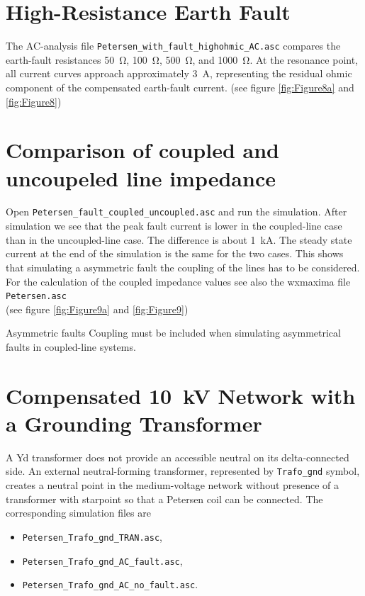 \section{High-Resistance Earth Fault}
\label{sec:110kv-high-resistance-earth-fault}

The AC-analysis file \texttt{Petersen\_with\_fault\_highohmic\_AC.asc}
compares the earth-fault resistances \SI{50}{\ohm}, \SI{100}{\ohm},
\SI{500}{\ohm}, and \SI{1000}{\ohm}. At the resonance point, all current
curves approach approximately \SI{3}{\ampere}, representing the residual
ohmic component of the compensated earth-fault current.
(see figure \ref{fig:Figure8a} and \ref{fig:Figure8})

\section{Comparison of coupled and uncoupeled line impedance}
\label{sec:coupled-uncoupled}
Open \texttt{Petersen\_fault\_coupled\_uncoupled.asc} and run the simulation.
After simulation we see that the peak fault current is lower in the coupled-line case than in the uncoupled-line case. The difference is about \SI{1}{\kilo\ampere}. The steady state current at the end of the simulation is the same for the two cases. 
This shows that simulating a asymmetric fault the coupling of the lines has to be
considered. For the calculation of the coupled impedance values see also the wxmaxima file \texttt{Petersen.asc}\\
(see figure \ref{fig:Figure9a} and \ref{fig:Figure9})

\begin{important}{Asymmetric faults}{}
	Coupling must be included when simulating asymmetrical faults in coupled-line systems.
\end{important}


\section{Compensated \SI{10}{\kilo\volt} Network with a Grounding Transformer}
\label{sec:grounding-transformer}
A Yd transformer does not provide an accessible neutral on its delta-connected
side. An external neutral-forming transformer, represented by
\texttt{Trafo\_gnd} symbol, creates a neutral point in the medium-voltage network without presence of a transformer with starpoint so that a Petersen coil can be connected. The corresponding simulation files are

\begin{itemize}
	\item \texttt{Petersen\_Trafo\_gnd\_TRAN.asc},
	\item \texttt{Petersen\_Trafo\_gnd\_AC\_fault.asc},
	\item \texttt{Petersen\_Trafo\_gnd\_AC\_no\_fault.asc}.
\end{itemize}

